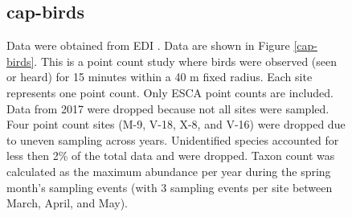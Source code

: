 \documentclass[11pt, oneside]{article}
\begin{document}
\begin{figure}[h!]
\subsection{cap-birds}
Data were obtained from EDI \citep{cap-birds}.
Data are shown in Figure \ref{cap-birds}.
This is a point count study where birds were observed (seen or heard) for 15 minutes within a 40 m fixed radius. 
Each site represents one point count. 
Only ESCA point counts are included. 
Data from 2017 were dropped because not all sites were sampled. 
Four point count sites (M-9, V-18, X-8, and V-16) were dropped due to uneven sampling across years. 
Unidentified species accounted for less then 2\% of the total data and were dropped. 
Taxon count was calculated as the maximum abundance per year during the spring month's sampling events (with 3 sampling events per site between March, April, and May). 
  


\end{figure}
\end{document}
